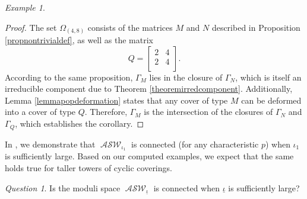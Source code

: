 \documentclass{compositio}
\theoremstyle{remark}
\newtheorem{example}[theorem]{Example}
\theoremstyle{remark}
\newtheorem{question}[theorem]{Question}
\DeclareMathOperator{\ASW}{\mathcal{ASW}}
\begin{document}
\begin{example}
\begin{proof}
The set $\Omega_{(4,8)}$ consists of the matrices $M$ and $N$ described in Proposition \ref{propnontrivialdef}, as well as the matrix
\begin{equation*}
Q=\begin{bmatrix}
2 & 4 \\
2 & 4 \\
\end{bmatrix}.
\end{equation*}
According to the same proposition, $\Gamma_M$ lies in the closure of $\Gamma_N$, which is itself an irreducible component due to Theorem \ref{theoremirredcomponent}. Additionally, Lemma \ref{lemmapopdeformation} states that any cover of type $M$ can be deformed into a cover of type $Q$. Therefore, $\Gamma_M$ is the intersection of the closures of $\Gamma_N$ and $\Gamma_Q$, which establishes the corollary.
\end{proof}

\end{example}

In \cite{DANG2020398}, we demonstrate that $\ASW_{\iota_1}$ is connected (for any characteristic $p$) when $\iota_1$ is sufficiently large. Based on our computed examples, we expect that the same holds true for taller towers of cyclic coverings.

\begin{question}
    Is the moduli space $\ASW_{\underline{\iota}}$ is connected when $\underline{\iota}$ is sufficiently large?
\end{question}




\end{document}
